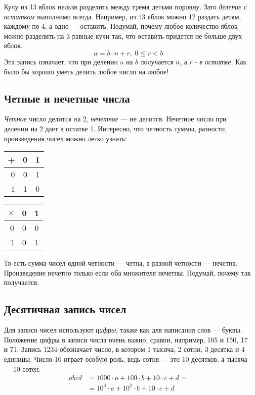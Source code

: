 \documentclass[a4paper,12pt]{article}
\begin{document}
    Кучу из 13 яблок нельзя разделить между тремя детьми поровну.
    Зато \emph{деление с остатком} выполнимо всегда. Например,
    из 13 яблок можно 12 раздать детям, каждому по 4, а 
    одно --- оставить.
    Подумай, почему любое количество яблок 
    можно разделить на 3 равные кучи так, что оставить придется не 
    больше двух яблок.
    \[
    a = b\cdot n + r, \; 0 \leqslant r < b 
    \]   
    Эта запись означает, что при делении $a$ на $b$ получается $n$, а 
    $r$ - \emph{в остатке}.
    Как было бы хорошо уметь делить любое число на любое!
    
    \subsection{Четные и нечетные числа}
    \emph{Четное} число делится на 2, \emph{нечетное} --- не делится. Нечетное число 
    при делении на 2 дает в остатке 1. Интересно, что четность суммы, разности,
    произведения чисел можно легко узнать:

    \vspace*{\baselineskip}
    
    \begin{tabular}{r|cc}
        + & 0 & 1 \\
        \hline
        0 & 0 & 1 \\
        1 & 1 & 0
    \end{tabular}
    \qquad
    \begin{tabular}{r|cc}
        $\times$ & 0 & 1 \\
        \hline
        0     & 0 & 0 \\
        1     & 0 & 1 \\
    \end{tabular}

    \vspace*{\baselineskip}

    То есть сумма чисел одной четности --- четна, а разной четности --- нечетна.
    Произведение нечетно только если оба множителя нечетны. Подумай, почему
    так получается.

    \subsection{Десятичная запись чисел}
    Для записи чисел используют \emph{цифры}, также как для написания слов --- буквы.
    Положение цифры в записи числа очень важно, сравни, например, 105 и 150, 17 и 71.
    Запись 1234 обозначает число, в котором 1 тысяча, 2 сотни, 3 десятка и 4 единицы.
    Число 10 играет особую роль, ведь сотня --- это 10 десятков, а тысяча --- 10 
    сотен. 
    \begin{align*}
        abcd &= 1000\cdot a + 100\cdot b + 10\cdot c +  d = \\
             &= 10^3\cdot a + 10^2\cdot b + 10\cdot c + d  
    \end{align*}
\end{document}
